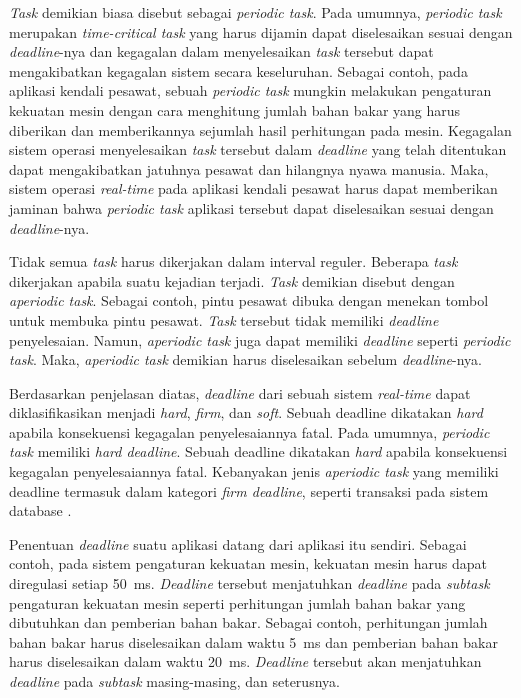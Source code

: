 \textit{Task} demikian biasa disebut sebagai \textit{periodic task}.
Pada umumnya, \textit{periodic task} merupakan \textit{time-critical task} yang harus dijamin dapat diselesaikan sesuai dengan \textit{deadline}-nya dan kegagalan dalam menyelesaikan \textit{task} tersebut dapat mengakibatkan kegagalan sistem secara keseluruhan.
Sebagai contoh, pada aplikasi kendali pesawat, sebuah \textit{periodic task} mungkin melakukan pengaturan kekuatan mesin dengan cara menghitung jumlah bahan bakar yang harus diberikan dan memberikannya sejumlah hasil perhitungan pada mesin.
Kegagalan sistem operasi menyelesaikan \textit{task} tersebut dalam \textit{deadline} yang telah ditentukan dapat mengakibatkan jatuhnya pesawat dan hilangnya nyawa manusia.
Maka, sistem operasi \textit{real-time} pada aplikasi kendali pesawat harus dapat memberikan jaminan bahwa \textit{periodic task} aplikasi tersebut dapat diselesaikan sesuai dengan \textit{deadline}-nya.

Tidak semua \textit{task} harus dikerjakan dalam interval reguler. Beberapa \textit{task} dikerjakan apabila suatu kejadian terjadi.
\textit{Task} demikian disebut dengan \textit{aperiodic task}.
Sebagai contoh, pintu pesawat dibuka dengan menekan tombol untuk membuka pintu pesawat.
\textit{Task} tersebut tidak memiliki \textit{deadline} penyelesaian.
Namun, \textit{aperiodic task} juga dapat memiliki \textit{deadline} seperti \textit{periodic task}.
Maka, \textit{aperiodic task} demikian harus diselesaikan sebelum \textit{deadline}-nya.

Berdasarkan penjelasan diatas, \textit{deadline} dari sebuah sistem \textit{real-time} dapat diklasifikasikan menjadi \textit{hard}, \textit{firm}, dan \textit{soft}.
Sebuah deadline dikatakan \textit{hard} apabila konsekuensi kegagalan penyelesaiannya fatal.
Pada umumnya, \textit{periodic task} memiliki \textit{hard deadline}.
Sebuah deadline dikatakan \textit{hard} apabila konsekuensi kegagalan penyelesaiannya fatal.
Kebanyakan jenis \textit{aperiodic task} yang memiliki deadline termasuk dalam kategori \textit{firm deadline}, seperti transaksi pada sistem database \citep[pp.~203-241]{Haritsa1992}.

Penentuan \textit{deadline} suatu aplikasi datang dari aplikasi itu sendiri.
Sebagai contoh, pada sistem pengaturan kekuatan mesin, kekuatan mesin harus dapat diregulasi setiap \SI{50}{\milli\second}.
\textit{Deadline} tersebut menjatuhkan \textit{deadline} pada \textit{subtask} pengaturan kekuatan mesin seperti perhitungan jumlah bahan bakar yang dibutuhkan dan pemberian bahan bakar.
Sebagai contoh, perhitungan jumlah bahan bakar harus diselesaikan dalam waktu \SI{5}{\milli\second} dan pemberian bahan bakar harus diselesaikan dalam waktu \SI{20}{\milli\second}.
\textit{Deadline} tersebut akan menjatuhkan \textit{deadline} pada \textit{subtask} masing-masing, dan seterusnya.

